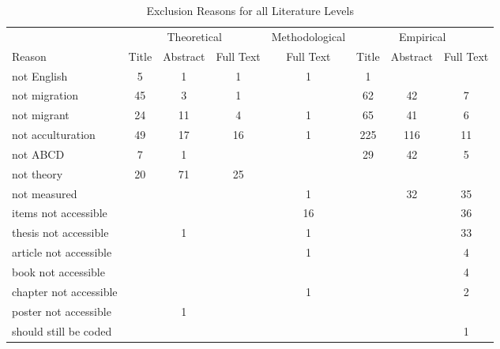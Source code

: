 \begin{table}
\begin{minipage}[t][\textheight][t]{\textwidth}

\caption{\label{tab:ExclusionsCombined}Exclusion Reasons for all Literature Levels}
\begin{tabular}[t]{lccccccc}
\toprule
\multicolumn{1}{c}{ } & \multicolumn{3}{c}{Theoretical} & \multicolumn{1}{c}{Methodological} & \multicolumn{3}{c}{Empirical} \\
\cmidrule(l{3pt}r{3pt}){2-4} \cmidrule(l{3pt}r{3pt}){5-5} \cmidrule(l{3pt}r{3pt}){6-8}
Reason & Title & Abstract & Full Text & Full Text & Title & Abstract & Full Text\\
\midrule
not English & 5 & 1 & 1 & 1 & 1 &  & \\
not migration & 45 & 3 & 1 &  & 62 & 42 & 7\\
not migrant & 24 & 11 & 4 & 1 & 65 & 41 & 6\\
not acculturation & 49 & 17 & 16 & 1 & 225 & 116 & 11\\
not ABCD & 7 & 1 &  &  & 29 & 42 & 5\\
not theory & 20 & 71 & 25 &  &  &  & \\
not measured &  &  &  & 1 &  & 32 & 35\\
items not accessible &  &  &  & 16 &  &  & 36\\
thesis not accessible &  & 1 &  & 1 &  &  & 33\\
article not accessible &  &  &  & 1 &  &  & 4\\
book not accessible &  &  &  &  &  &  & 4\\
chapter not accessible &  &  &  & 1 &  &  & 2\\
poster not accessible &  & 1 &  &  &  &  & \\
should still be coded &  &  &  &  &  &  & 1\\
\bottomrule
\end{tabular}
\end{minipage}
\end{table}
